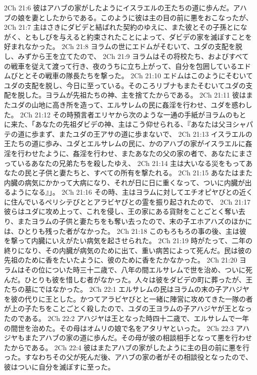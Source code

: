 2Ch 21:6  彼はアハブの家がしたようにイスラエルの王たちの道に歩んだ。アハブの娘を妻としたからである。このように彼は主の目の前に悪をおこなったが、
2Ch 21:7  主はさきにダビデと結ばれた契約のゆえに、また彼とその子孫とにながく、ともしびを与えると約束されたことによって、ダビデの家を滅ぼすことを好まれなかった。
2Ch 21:8  ヨラムの世にエドムがそむいて、ユダの支配を脱し、みずから王を立てたので、
2Ch 21:9  ヨラムはその将校たち、およびすべての戦車を従えて渡って行き、夜のうちに立ち上がって、自分を包囲しているエドムびととその戦車の隊長たちを撃った。
2Ch 21:10  エドムはこのようにそむいてユダの支配を脱し、今日に至っている。そのころリブナもまたそむいてユダの支配を脱した。ヨラムが先祖たちの神、主を捨てたからである。
2Ch 21:11  彼はまたユダの山地に高き所を造って、エルサレムの民に姦淫を行わせ、ユダを惑わした。
2Ch 21:12  その時預言者エリヤから次のような一通の手紙がヨラムのもとに来た、「あなたの先祖ダビデの神、主はこう仰せられる、『あなたは父ヨシャパテの道に歩まず、またユダの王アサの道に歩まないで、
2Ch 21:13  イスラエルの王たちの道に歩み、ユダとエルサレムの民に、かのアハブの家がイスラエルに姦淫を行わせたように、姦淫を行わせ、またあなたの父の家の者で、あなたにまさっているあなたの兄弟たちを殺したゆえ、
2Ch 21:14  主は大いなる災をもってあなたの民と子供と妻たちと、すべての所有を撃たれる。
2Ch 21:15  あなたはまた内臓の病気にかかって大病になり、それが日に日に重くなって、ついに内臓が出るようになる』」。
2Ch 21:16  その時、主はヨラムに対してエチオピヤびとの近くに住んでいるペリシテびととアラビヤびとの霊を振り起されたので、
2Ch 21:17  彼らはユダに攻め上って、これを侵し、王の家にある貨財をことごとく奪い去り、またヨラムの子供と妻たちをも奪い去ったので、末の子エホアハズのほかには、ひとりも残った者がなかった。
2Ch 21:18  このもろもろの事の後、主は彼を撃って内臓にいえがたい病気を起させられた。
2Ch 21:19  時がたって、二年の終りになり、その内臓が病気のために出て、重い病苦によって死んだ。民は彼の先祖のために香をたいたように、彼のために香をたかなかった。
2Ch 21:20  ヨラムはその位についた時三十二歳で、八年の間エルサレムで世を治め、ついに死んだ。ひとりも彼を惜しむ者がなかった。人々は彼をダビデの町に葬ったが、王たちの墓にではなかった。
2Ch 22:1  エルサレムの民はヨラムの末の子アハジヤを彼の代りに王とした。かつてアラビヤびとと一緒に陣営に攻めてきた一隊の者が上の子たちをことごとく殺したので、ユダの王ヨラムの子アハジヤが王となったのである。
2Ch 22:2  アハジヤは王となった時四十二歳で、エルサレムで一年の間世を治めた。その母はオムリの娘で名をアタリヤといった。
2Ch 22:3  アハジヤもまたアハブの家の道に歩んだ。その母が彼の相談相手となって悪を行わせたからである。
2Ch 22:4  彼はまたアハブの家がしたように主の目の前に悪を行った。すなわちその父が死んだ後、アハブの家の者がその相談役となったので、彼はついに自分を滅ぼすに至った。
